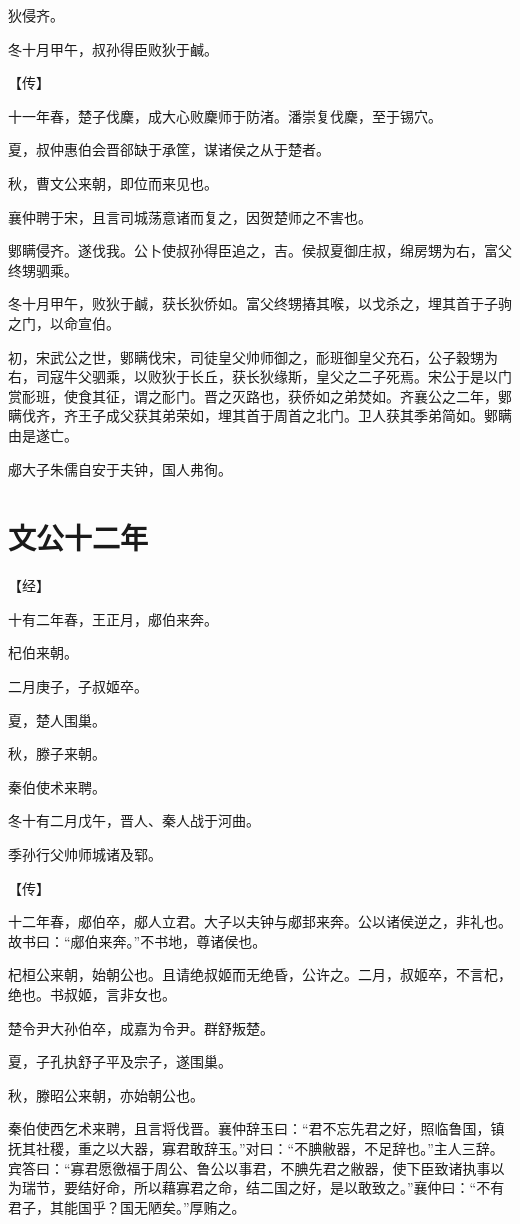 \documentclass[a4paper,12pt,UTF8,twoside]{ctexbook}
\begin{document}
狄侵齐。

冬十月甲午，叔孙得臣败狄于鹹。

【传】

十一年春，楚子伐麇，成大心败麇师于防渚。潘崇复伐麇，至于锡穴。

夏，叔仲惠伯会晋郤缺于承筐，谋诸侯之从于楚者。

秋，曹文公来朝，即位而来见也。

襄仲聘于宋，且言司城荡意诸而复之，因贺楚师之不害也。

鄋瞒侵齐。遂伐我。公卜使叔孙得臣追之，吉。侯叔夏御庄叔，绵房甥为右，富父终甥驷乘。



冬十月甲午，败狄于鹹，获长狄侨如。富父终甥摏其喉，以戈杀之，埋其首于子驹之门，以命宣伯。

初，宋武公之世，鄋瞒伐宋，司徒皇父帅师御之，耏班御皇父充石，公子穀甥为右，司寇牛父驷乘，以败狄于长丘，获长狄缘斯，皇父之二子死焉。宋公于是以门赏耏班，使食其征，谓之耏门。晋之灭路也，获侨如之弟焚如。齐襄公之二年，鄋瞒伐齐，齐王子成父获其弟荣如，埋其首于周首之北门。卫人获其季弟简如。鄋瞒由是遂亡。

郕大子朱儒自安于夫钟，国人弗徇。

\section{文公十二年}


【经】

十有二年春，王正月，郕伯来奔。

杞伯来朝。

二月庚子，子叔姬卒。

夏，楚人围巢。

秋，滕子来朝。

秦伯使术来聘。

冬十有二月戊午，晋人、秦人战于河曲。

季孙行父帅师城诸及郓。

【传】

十二年春，郕伯卒，郕人立君。大子以夫钟与郕邽来奔。公以诸侯逆之，非礼也。故书曰：“郕伯来奔。”不书地，尊诸侯也。

杞桓公来朝，始朝公也。且请绝叔姬而无绝昏，公许之。二月，叔姬卒，不言杞，绝也。书叔姬，言非女也。

楚令尹大孙伯卒，成嘉为令尹。群舒叛楚。

夏，子孔执舒子平及宗子，遂围巢。

秋，滕昭公来朝，亦始朝公也。

秦伯使西乞术来聘，且言将伐晋。襄仲辞玉曰：“君不忘先君之好，照临鲁国，镇抚其社稷，重之以大器，寡君敢辞玉。”对曰：“不腆敝器，不足辞也。”主人三辞。宾答曰：“寡君愿徼福于周公、鲁公以事君，不腆先君之敝器，使下臣致诸执事以为瑞节，要结好命，所以藉寡君之命，结二国之好，是以敢致之。”襄仲曰：“不有君子，其能国乎？国无陋矣。”厚贿之。
\end{document}
